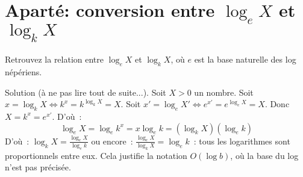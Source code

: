 \documentclass[a4paper]{article}
\begin{document}
\section*{Apart\'e: conversion entre $\log_e X$ et $\log_k X$}
Retrouvez la relation entre $\log_e X$ et $\log_k X$, o\`u $e$ est la base naturelle des log n\'ep\'eriens.

Solution (\`a ne pas lire tout de suite...). Soit $X>0$ un nombre. Soit 
$x=\log_k X \Leftrightarrow k^x=k^{\log_k X}=X$.
Soit 
$x'=\log_e X' \Leftrightarrow  e^{x'}=e^{\log_e X}= X $. Donc $X=k^x=e^{x'}$. D'o\`u~:
$$ \log_e X= \log_e k^x = x \log_e k=(\log_k X) (\log_e k)$$
D'o\`u~: $\log_k X = \frac{\log_e X}{\log_e k}$ ou encore~: $\frac{\log_e X}{\log_k X}=\log_e k$~: 
tous les logarithmes sont proportionnels entre eux. 
Cela justifie la notation $O(\log b)$, o\`u la base du log n'est pas pr\'ecis\'ee. 
\end{document}
